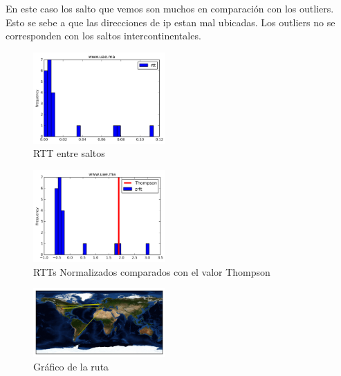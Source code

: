 En este caso los salto que vemos son muchos en comparaci\'on con los outliers. Esto se sebe a que las direcciones de ip estan mal ubicadas. Los outliers no se corresponden con los saltos intercontinentales. 

\begin{figure}[H]
  \centering
    \includegraphics[width=0.45\textwidth]{histogramas_rtt/www-uae-ma.png}
  \caption{RTT entre saltos}
  \label{entropia-s}
\end{figure}

\begin{center}

\end{center}

\begin{figure}[H]
  \centering
    \includegraphics[width=0.45\textwidth]{histogramas_thompson/www-uae-ma.png}
  \caption{RTTs Normalizados comparados con el valor Thompson}
  \label{entropia-s}
\end{figure}

\begin{figure}[H]
  \centering
    \includegraphics[width=0.45\textwidth]{grafico-rutas/www-uae-ma.png}
  \caption{Gráfico de la ruta}
  \label{entropia-s}
\end{figure}




